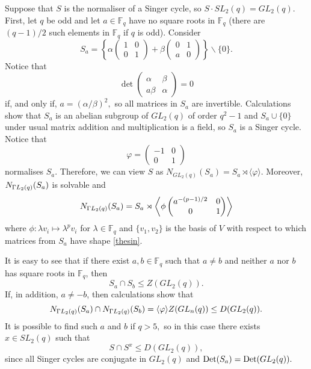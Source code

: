 Suppose  that $S$  is the normaliser of a Singer cycle, so $S \cdot SL_2(q)=GL_2(q).$ First, let $q$ be odd and let $a \in \mathbb{F}_q$ have no square roots in $\mathbb{F}_q$ (there are $(q-1)/2$ such elements in $\mathbb{F}_q$ if $q$ is odd). Consider 
\begin{equation}\label{thesin}
 S_a= \left\{
\alpha \begin{pmatrix}
1    & 0  \\
      0    &   1       
\end{pmatrix} + 
\beta \begin{pmatrix}
0    & 1  \\
a    &  0       
\end{pmatrix}
\right\} \backslash \{0\}.
\end{equation}
 Notice that 
$$\det \begin{pmatrix}
\alpha    & \beta  \\
    a  \beta    & \alpha       
\end{pmatrix} =0$$ if, and only if, $a=(\alpha/ \beta)^2,$ so all matrices in $S_a$ are invertible. 
 Calculations show that $S_a$ is an abelian subgroup of $GL_2(q)$ of order $q^2-1$ and $S_a \cup \{0\}$ under usual matrix addition and multiplication is a field, so $S_a$ is a Singer cycle. Notice that 
$$\varphi = \begin{pmatrix}
-1    & 0  \\
0    &  1       
\end{pmatrix}$$
normalises $S_a.$ Therefore, we can view $S$ as   $N_{GL_2(q)}(S_a)=S_a \rtimes \langle \varphi \rangle$. Moreover, $N_{{{\Gamma L}}_2(q)}(S_a)$ is solvable and 
$$N_{{{\Gamma L}}_2(q)}(S_a) = S_a \rtimes \left\langle \phi \begin{pmatrix}
a^{-(p-1)/2}    & 0  \\
0    &  1       
\end{pmatrix} \right\rangle$$ 
where $\phi : \lambda v_i \mapsto \lambda^p v_i$ for $\lambda \in \mathbb{F}_q$ and $\{v_1, v_2\}$ is the basis of $V$ with respect to which matrices from $S_a$ have shape \eqref{thesin}. 

 It is easy to see that if there exist $a, b \in \mathbb{F}_q$ such that $a \ne b$
and neither $a$ nor $b$ has square roots in $\mathbb{F}_q$, then $$S_a \cap S_b \le Z(GL_2(q)).$$ 
If, in addition, $a \ne -b$, then calculations show that 
\begin{equation}
\label{2sindiagodd}
 N_{{{\Gamma L}}_2(q)}(S_a) \cap N_{{{\Gamma L}}_2(q)}(S_b) =\langle \varphi \rangle Z(GL_n(q)) \le D(GL_2(q)).
\end{equation} 
It is possible to find such $a$ and $b$ if $q>5,$ so in this case there exists $x \in SL_2(q)$ such that $$S \cap S^x \le D(GL_2(q)),$$ since all Singer cycles are conjugate in $GL_2(q)$ and $\mathrm{Det}(S_a)=\mathrm{Det}(GL_2(q)).$

